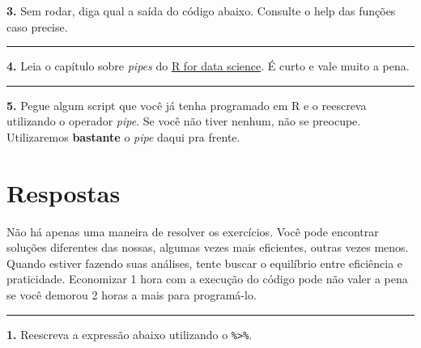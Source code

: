\documentclass[]{book}
\newenvironment{Shaded}{\begin{snugshade}}{\end{snugshade}}
\newcommand{\DataTypeTok}[1]{\textcolor[rgb]{0.13,0.29,0.53}{#1}}
\newcommand{\DecValTok}[1]{\textcolor[rgb]{0.00,0.00,0.81}{#1}}
\newcommand{\KeywordTok}[1]{\textcolor[rgb]{0.13,0.29,0.53}{\textbf{#1}}}
\newcommand{\NormalTok}[1]{#1}
\newcommand{\OperatorTok}[1]{\textcolor[rgb]{0.81,0.36,0.00}{\textbf{#1}}}
\newcommand{\OtherTok}[1]{\textcolor[rgb]{0.56,0.35,0.01}{#1}}
\newcommand{\StringTok}[1]{\textcolor[rgb]{0.31,0.60,0.02}{#1}}
\begin{document}
\textbf{3.} Sem rodar, diga qual a saída do código abaixo. Consulte o help das funções caso precise.

\begin{Shaded}
\end{Shaded}

\begin{center}\rule{0.5\linewidth}{0.5pt}\end{center}

\textbf{4.} Leia o capítulo sobre \emph{pipes} do \href{http://r4ds.had.co.nz/pipes.html}{R for data science}. É curto e vale muito a pena.

\begin{center}\rule{0.5\linewidth}{0.5pt}\end{center}

\textbf{5.} Pegue algum script que você já tenha programado em R e o reescreva utilizando o operador \emph{pipe}. Se você não tiver nenhum, não se preocupe. Utilizaremos \textbf{bastante} o \emph{pipe} daqui pra frente.

\hypertarget{respostas}{%
\section{Respostas}\label{respostas}}

Não há apenas uma maneira de resolver os exercícios. Você pode encontrar soluções diferentes das nossas, algumas vezes mais eficientes, outras vezes menos. Quando estiver fazendo suas análises, tente buscar o equilíbrio entre eficiência e praticidade. Economizar 1 hora com a execução do código pode não valer a pena se você demorou 2 horas a mais para programá-lo.

\begin{center}\rule{0.5\linewidth}{0.5pt}\end{center}

\textbf{1.} Reescreva a expressão abaixo utilizando o \texttt{\%\textgreater{}\%}.
\end{document}
